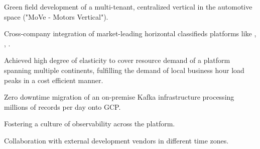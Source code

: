 \documentclass[]{resume}
\begin{document}
\begin{minipage}[t]{0.64\textwidth}
\vspace{\topsep} %
\begin{tightemize}
\item Green field development of a multi-tenant, centralized vertical in the automotive space ("MoVe - Motors Vertical").
\item Cross-company integration of market-leading horizontal classifieds platforms like \href{https://www.kijiji.ca}{}, \href{https://www.gumtree.com.au}{}, \href{https://www.gumtree.co.uk}{}.
\item Achieved high degree of elasticity to cover resource demand of a platform spanning multiple continents, fulfilling the demand of local business hour load peaks in a cost efficient manner.
\item Zero downtime migration of an on-premise Kafka infrastructure processing millions of records per day onto GCP.
\item Fostering a culture of observability across the platform.
\item Collaboration with external development vendors in different time zones.
\end{tightemize}
\sectionsep

\sectionsep

\sectionsep

\sectionsep

\sectionsep

\sectionsep

\end{minipage} 
\end{document}
